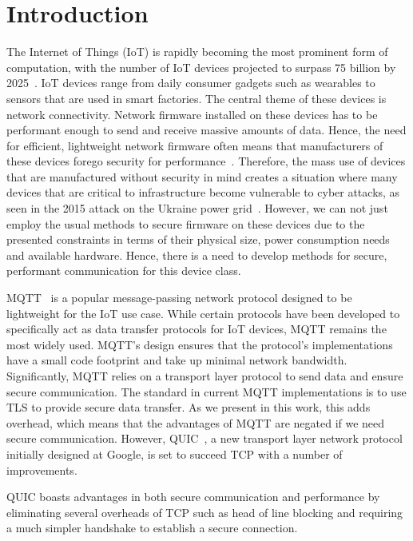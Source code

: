 \chapter{Introduction}


The Internet of Things (IoT) is rapidly becoming the most prominent form of computation, with the number of IoT devices projected to surpass 75 billion by 2025~\citep{statista_number_2016}.
IoT devices range from daily consumer gadgets such as wearables to sensors that are used in smart factories.
The central theme of these devices is network connectivity.
Network firmware installed on these devices has to be performant enough to send and receive massive amounts of data. 
Hence, the need for efficient, lightweight network firmware often means that manufacturers of these devices forego security for performance~\cite{ling_iot_2018}.
Therefore, the mass use of devices that are manufactured without security in mind creates a situation where many devices that are critical to infrastructure become vulnerable to cyber attacks, as seen in the 2015 attack on the Ukraine power grid~\citep{Liang2017}.
However, we can not just employ the usual methods to secure firmware on these devices due to the presented constraints in terms of their physical size, power consumption needs and available hardware.
Hence, there is a need to develop methods for secure, performant communication for this device class.

MQTT~\citep{oasis_mqtt_2014} is a popular message-passing network protocol designed to be lightweight for the IoT use case.
While certain protocols have been developed to specifically act as data transfer protocols for IoT devices, MQTT remains the most widely used.
MQTT's design ensures that the protocol's implementations have a small code footprint and take up minimal network bandwidth.
Significantly, MQTT relies on a transport layer protocol to send data and ensure secure communication.
The standard in current MQTT implementations is to use TLS to provide secure data transfer.
As we present in this work, this adds overhead, which means that the advantages of MQTT are negated if we need secure communication.
However, QUIC~\citep{iyengar_quic_2021}, a new transport layer network protocol initially designed at Google, is set to succeed TCP with a number of improvements.

QUIC boasts advantages in both secure communication and performance by eliminating several overheads of TCP such as head of line blocking and requiring a much simpler handshake to establish a secure connection.

